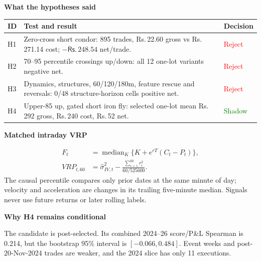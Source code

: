 \documentclass[10pt,a4paper]{article}
\newcommand{\INR}{\textsf{Rs.}\,}
\begin{document}
\begin{minipage}[t]{0.485\linewidth}
{\large\bfseries\color{Navy} What the hypotheses said}\par
\vspace{1mm}
\begin{tabularx}{\linewidth}{@{}p{8mm}Y p{18mm}@{}}
\toprule
ID & Test and result & Decision \\
\midrule
H1 & Zero-cross short condor: 895 trades, \INR22.60 gross vs \INR271.14 cost; $-\INR248.54$ net/trade. & \textcolor{Red}{Reject} \\
H2 & 70--95 percentile crossings up/down: all 12 one-lot variants negative net. & \textcolor{Red}{Reject} \\
H3 & Dynamics, structures, 60/120/180m, feature rescue and reversals: 0/48 structure-horizon cells positive net. & \textcolor{Red}{Reject} \\
H4 & Upper-85 up, gated short iron fly: selected one-lot mean \INR292 gross, \INR240 cost, \INR52 net. & \textcolor{Green}{Shadow} \\
\bottomrule
\end{tabularx}

\vspace{2mm}
{\large\bfseries\color{Navy} Matched intraday VRP}\par
\[
\begin{aligned}
F_t&=\operatorname{median}_{K}\{K+e^{rT}(C_t-P_t)\},\\
VRP_{t,60}&=\widehat\sigma_{IV,t}^{2}-\frac{\sum_{i=1}^{60}r_i^2}{60/525600}.
\end{aligned}
\]
The causal percentile compares only prior dates at the same minute of day; velocity and acceleration are changes in its trailing five-minute median. Signals never use future returns or later rolling labels.

\vspace{1mm}
{\large\bfseries\color{Navy} Why H4 remains conditional}\par
The candidate is post-selected. Its combined 2024--26 score/P\&L Spearman is 0.214, but the bootstrap 95\% interval is $[-0.066,0.484]$. Event weeks and post-20-Nov-2024 trades are weaker, and the 2024 slice has only 11 executions.
\end{minipage}
\end{document}
